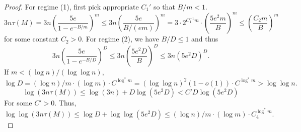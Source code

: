 \documentclass[10pt,a4paper]{article}
\theoremstyle{remark}
\numberwithin{equation}{section}
\numberwithin{theorem}{section}
\begin{document}
\begin{proof}
For regime (1), first pick appropriate $C_1'$ so that $B/m < 1$.
\[3n\tau(M) = 3n\left(\frac{5e}{1 - e^{-B/m}}\right)^m \le 3n\left(\frac{5e}{B/(em)}\right)^m
=3 \cdot 2^{C_1^{-1}m} \cdot \left(\frac {5e^2m}B\right)^m \le \left(\frac {C_2m}B\right)^m\]
for some constant $C_2 > 0$.
For regime (2), we have $B/D \le 1$ and thus
\[3n\left(\frac{5e}{1 - e^{-B/D}}\right)^D \le 3n\left(\frac{5e^2D}{B}\right)^D \le 3n(5e^2D)^D.\]
If $m < (\log n)/(\log \log n)$,
\[\log D = (\log n)/m \cdot (\log m) \cdot C^{\log^* m}
= (\log\log n)^2(1 - o(1)) \cdot C^{\log^* m} > \log \log n.\]
\[\log(3n\tau(M)) \le \log(3n) + D\log(5e^2D) < C'D\log(5e^2D)\]
For some $C' > 0$. Thus,
\[\log \log(3n\tau(M)) \le \log D + \log\log(5e^2D) \le (\log n)/m \cdot (\log m) \cdot C_4^{\log^* m}.\]

\end{proof}
\end{document}
